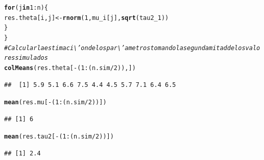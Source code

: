 \documentclass[10pt,openright]{book}\usepackage[]{graphicx}\usepackage[]{color}
\makeatletter
\newcommand{\hlnum}[1]{\textcolor[rgb]{0.686,0.059,0.569}{#1}}%
\newcommand{\hlcom}[1]{\textcolor[rgb]{0.678,0.584,0.686}{\textit{#1}}}%
\newcommand{\hlopt}[1]{\textcolor[rgb]{0,0,0}{#1}}%
\newcommand{\hlstd}[1]{\textcolor[rgb]{0.345,0.345,0.345}{#1}}%
\newcommand{\hlkwa}[1]{\textcolor[rgb]{0.161,0.373,0.58}{\textbf{#1}}}%
\newcommand{\hlkwb}[1]{\textcolor[rgb]{0.69,0.353,0.396}{#1}}%
\newcommand{\hlkwd}[1]{\textcolor[rgb]{0.737,0.353,0.396}{\textbf{#1}}}%
\newenvironment{kframe}{%
 \def\at@end@of@kframe{}%
 \ifinner\ifhmode%
  \def\at@end@of@kframe{\end{minipage}}%
  \begin{minipage}{\columnwidth}%
 \fi\fi%
 \def\FrameCommand##1{\hskip\@totalleftmargin \hskip-\fboxsep
 \colorbox{shadecolor}{##1}\hskip-\fboxsep
     \hskip-\linewidth \hskip-\@totalleftmargin \hskip\columnwidth}%
 \MakeFramed {\advance\hsize-\width
   \@totalleftmargin\z@ \linewidth\hsize
   \@setminipage}}%
 {\par\unskip\endMakeFramed%
 \at@end@of@kframe}
\newenvironment{knitrout}{}{} %
\makeatother
\begin{document}
\begin{knitrout}
\begin{kframe}
\begin{alltt}
  \hlkwa{for}\hlstd{(j} \hlkwa{in} \hlnum{1}\hlopt{:}\hlstd{n)\{}
    \hlstd{res.theta[i,j]} \hlkwb{<-} \hlkwd{rnorm}\hlstd{(}\hlnum{1}\hlstd{, mu_i[j],} \hlkwd{sqrt}\hlstd{(tau2_1))}
  \hlstd{\}}
\hlstd{\}}
 \hlcom{# Calcular la estimaci\textbackslash{}'on de los par\textbackslash{}'ametros tomando la segunda mitad de los valores simulados}
 \hlkwd{colMeans}\hlstd{(res.theta[}\hlopt{-}\hlstd{(}\hlnum{1}\hlopt{:}\hlstd{(n.sim}\hlopt{/}\hlnum{2}\hlstd{)),])}
\end{alltt}
\begin{verbatim}
##  [1] 5.9 5.1 6.6 7.5 4.4 4.5 5.7 7.1 6.4 6.5
\end{verbatim}
\begin{alltt}
 \hlkwd{mean}\hlstd{(res.mu[}\hlopt{-}\hlstd{(}\hlnum{1}\hlopt{:}\hlstd{(n.sim}\hlopt{/}\hlnum{2}\hlstd{))])}
\end{alltt}
\begin{verbatim}
## [1] 6
\end{verbatim}
\begin{alltt}
 \hlkwd{mean}\hlstd{(res.tau2[}\hlopt{-}\hlstd{(}\hlnum{1}\hlopt{:}\hlstd{(n.sim}\hlopt{/}\hlnum{2}\hlstd{))])}
\end{alltt}
\begin{verbatim}
## [1] 2.4
\end{verbatim}
\end{kframe}
\end{knitrout}
\end{document}
